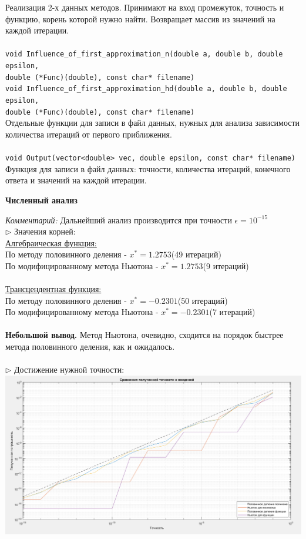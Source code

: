 \documentclass{article}
\begin{document}
	Реализация 2-х данных методов. Принимают на вход промежуток, точность и функцию, корень которой нужно найти. Возвращает массив из значений на каждой итерации.\\
	\\
	\verb|void Influence_of_first_approximation_n(double a, double b, double epsilon,|\\
	\verb|double (*Func)(double), const char* filename)|\\
	\verb|void Influence_of_first_approximation_hd(double a, double b, double epsilon,|\\
	\verb|double (*Func)(double), const char* filename)|\\
	Отдельные функции для записи в файл данных, нужных для анализа зависимости количества итераций от первого приближения.\\
	\\
	\verb|void Output(vector<double> vec, double epsilon, const char* filename)|\\
	Функция для записи в файл данных: точности, количества итераций, конечного ответа и значений на каждой итерации.
	\begin{center} \textbf{Численный анализ}\end{center}
	\textit{Комментарий:} Дальнейший анализ производится при точности $\epsilon = 10^{-15}$\\
	$\triangleright$ Значения корней:\\
	\underline{Алгебраическая функция:}\\
	По методу половинного деления - $x^* = 1.2753$(49 итераций)\\
	По модифицированному метода Ньютона - $x^* = 1.2753$(9 итераций)\\
	\\
	\underline{Трансцендентная функция:}\\
	По методу половинного деления - $x^* = -0.2301$(50 итераций)\\
	По модифицированному метода Ньютона - $x^* = -0.2301$(7 итераций)\\
	\\
	\textbf{Небольшой вывод.} Метод Ньютона, очевидно, сходится на порядок быстрее метода половинного деления, как и ожидалось.\\
	\\
	\newpage
	\hspace*{-0.65 cm} $\triangleright$ Достижение нужной точности:\\
	\includegraphics[scale = 0.41]{Сравнение точности}\\
\end{document}
